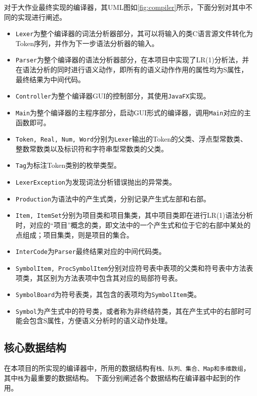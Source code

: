 \documentclass{ML}
\begin{document}
对于大作业最终实现的编译器，其UML图如\ref{fig:compiler}所示，下面分别对其中不同的实现进行阐述。
\begin{itemize}
    \item \texttt{Lexer}为整个编译器的词法分析器部分，其可以将输入的类C语言源文件转化为Token序列，并作为下一步语法分析器的输入。
    \item \texttt{Parser}为整个编译器的语法分析器部分，在本项目中实现了LR(1)分析法，并在语法分析的同时进行语义动作，即所有的语义动作作用的属性均为S属性\cite{dragon-book}，最终结果为中间代码。
    \item \texttt{Controller}为整个编译器GUI的控制部分，其使用\texttt{JavaFX}实现。
    \item \texttt{Main}为整个编译器的主程序部分，启动GUI形式的编译器，调用\texttt{Main}对应的主函数即可。
    \item \texttt{Token, Real, Num, Word}分别为\texttt{Lexer}输出的Token的父类、浮点型常数类、整数常数类以及标识符和字符串型常数类的父类。
    \item \texttt{Tag}为标注Token类别的枚举类型。
    \item \texttt{LexerException}为发现词法分析错误抛出的异常类。
    \item \texttt{Production}为语法中的产生式类，分别记录产生式左部和右部。
    \item \texttt{Item, ItemSet}分别为项目类和项目集类，其中项目类即在进行LR(1)语法分析时，对应的“项目”概念的类，即文法中的一个产生式和位于它的右部中某处的点组成；项目集类，则是项目的集合。
    \item \texttt{InterCode}为\texttt{Parser}最终结果对应的中间代码类。
    \item \texttt{SymbolItem, ProcSymbolItem}分别对应符号表中表项的父类和符号表中方法表项类，其区别为方法表项中包含其对应的局部符号表。
    \item \texttt{SymbolBoard}为符号表类，其包含的表项均为\texttt{SymbolItem}类。
    \item \texttt{Symbol}为产生式中的符号类，或者称为非终结符类，其在产生式中的右部时可能会包含S属性，方便语义分析时的语义动作处理。
\end{itemize}

\subsection{核心数据结构}
在本项目的所实现的编译器中，所用的数据结构有\texttt{栈、队列、集合、Map和多维数组}，其中\texttt{栈}为最重要的数据结构。
下面分别阐述各个数据结构在编译器中起到的作用。
\end{document}
